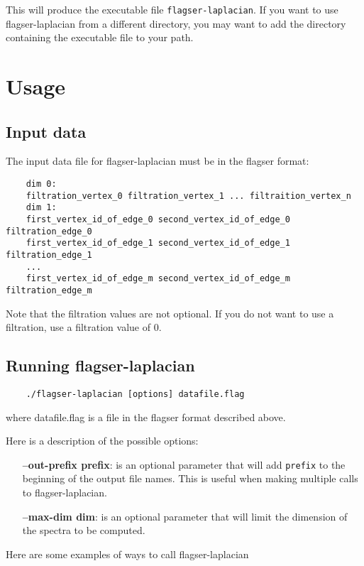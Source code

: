 \documentclass{article}
\begin{document}
This will produce the executable file \verb|flagser-laplacian|. If you want to use flagser-laplacian from a different directory, you may want to add the directory containing the executable file to your path.

\section{Usage}

\subsection{Input data}
The input data file for flagser-laplacian must be in the flagser format:

\begin{verbatim}
    dim 0:
    filtration_vertex_0 filtration_vertex_1 ... filtraition_vertex_n
    dim 1:
    first_vertex_id_of_edge_0 second_vertex_id_of_edge_0 filtration_edge_0
    first_vertex_id_of_edge_1 second_vertex_id_of_edge_1 filtration_edge_1
    ...
    first_vertex_id_of_edge_m second_vertex_id_of_edge_m filtration_edge_m
\end{verbatim}

Note that the filtration values are not optional. If you do not want to use a filtration, use a filtration value of $0$.

\subsection{Running flagser-laplacian}
\begin{verbatim}
    ./flagser-laplacian [options] datafile.flag
\end{verbatim}

where datafile.flag is a file in the flagser format described above.

Here is a description of the possible options:

\begin{itemize}
    \item[\textbf{--out-prefix prefix}:] is an optional parameter that will add \verb|prefix| to the beginning of the output file names. This is useful when making multiple calls to flagser-laplacian.
    \item[\textbf{--max-dim dim}:] is an optional parameter that will limit the dimension of the spectra to be computed.
\end{itemize}

Here are some examples of ways to call flagser-laplacian
\end{document}
